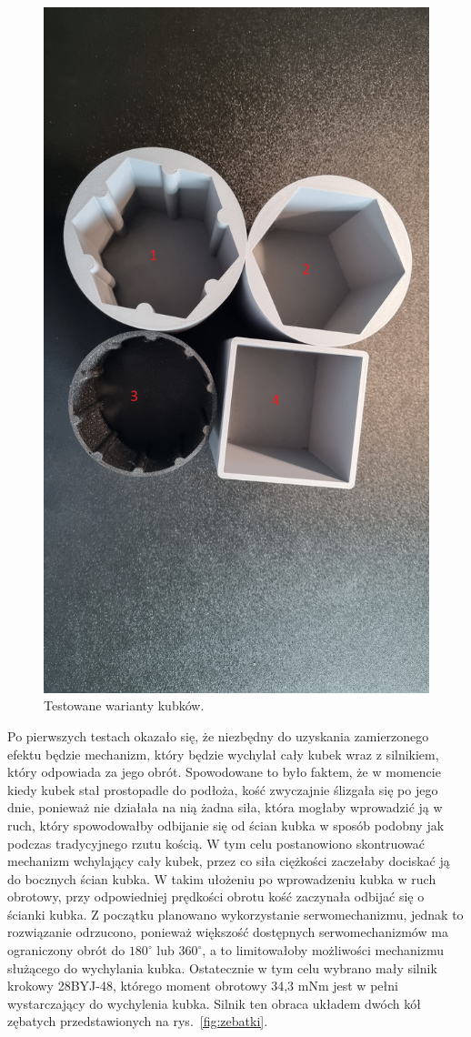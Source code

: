 \begin{figure}[H]
    \centering
    \includegraphics[width=0.65\linewidth, trim={35mm 380mm 20mm 240mm}, clip]{chapters/03-praca-wlasna/figures/kubki}
    \caption{\label{fig:kubki}Testowane warianty kubków.}
\end{figure}

Po pierwszych testach okazało się, że niezbędny do uzyskania zamierzonego efektu będzie mechanizm, który będzie 
wychylał cały kubek wraz z silnikiem, który odpowiada za jego obrót. Spowodowane to było faktem, że w momencie kiedy kubek stał prostopadle do podłoża, kość
zwyczajnie ślizgała się po jego dnie, ponieważ nie działała na nią żadna siła, która mogłaby wprowadzić ją w ruch, który spowodowałby odbijanie się od ścian kubka w sposób podobny jak podczas tradycyjnego rzutu kością. 
W tym celu postanowiono skontruować mechanizm wchylający cały kubek, przez co siła ciężkości zaczełaby dociskać ją do bocznych ścian kubka. W takim ułożeniu po wprowadzeniu
kubka w ruch obrotowy, przy odpowiedniej prędkości obrotu kość zaczynała odbijać się o ścianki kubka. Z początku planowano wykorzystanie
serwomechanizmu, jednak to rozwiązanie odrzucono, ponieważ większość dostępnych serwomechanizmów ma
ograniczony obrót do $180^{\circ}$ lub $360^{\circ}$, a to limitowałoby możliwości mechanizmu służącego do wychylania kubka.
Ostatecznie w tym celu wybrano mały silnik krokowy 28BYJ-48, którego moment obrotowy 34,3 mNm jest w pełni wystarczający do wychylenia kubka.
Silnik ten obraca układem dwóch kół zębatych przedstawionych na rys.~\ref{fig:zebatki}.

